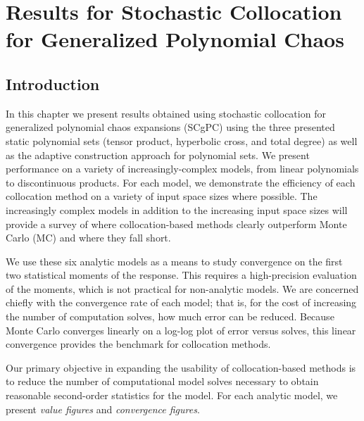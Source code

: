 
\chapter{Results for Stochastic Collocation for Generalized Polynomial Chaos} %

\label{ch:results scgpc} %



\section{Introduction}\label{sec:res scgpc intro}
In this chapter we present results obtained using stochastic collocation for generalized polynomial chaos
expansions (SCgPC) using the three presented static polynomial sets (tensor product, hyperbolic cross, and
total degree) as well as the adaptive construction approach for polynomial sets.  We present performance on 
a variety of increasingly-complex
models, from linear polynomials to discontinuous products.  For each model, we demonstrate the
efficiency of each collocation method on a variety of input space sizes where possible.  The increasingly
complex models in addition to the increasing input space sizes will provide a survey of where
collocation-based methods clearly outperform Monte Carlo (MC) and where they fall short.

We use these six analytic models as a means to study convergence on the first two statistical moments of the
response.  This requires a high-precision evaluation of the moments, which is not practical for non-analytic
models.  We are concerned chiefly with the convergence rate of each model; that is, for the cost of increasing
the number of computation solves, how much error can be reduced.  Because Monte Carlo converges linearly on a
log-log plot of error versus solves, this linear convergence provides the benchmark for collocation methods.

Our primary objective in expanding the usability of collocation-based methods is to reduce the number of
computational model solves necessary to obtain reasonable second-order statistics for the model.  For each
analytic model, we present \emph{value figures} and \emph{convergence figures}.  


